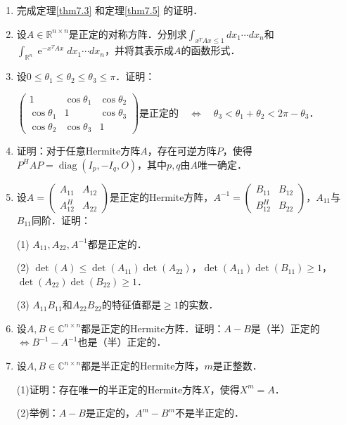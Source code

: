 \documentclass[a4paper,fontset=windows]{ctexbook}
\theoremstyle{definition}
\DeclareMathOperator{\diag}{diag}
\DeclareMathOperator{\E}{e}
\renewcommand{\le}{\leqslant}
\renewcommand{\ge}{\geqslant}
\begin{document}
\begin{enumerate}
\item 完成定理\ref{thm7.3} 和定理\ref{thm7.5} 的证明．

\item 设$A\in\mathbb{R}^{n\times n}$是正定的对称方阵．分别求$\displaystyle\int_{x^TAx\le 1}dx_1\cdots dx_n$和$\displaystyle\int_{\mathbb{R}^n}\E^{-x^TAx}dx_1\cdots dx_n$，并将其表示成$A$的函数形式．

\item 设$0\le\theta_1\le\theta_2\le\theta_3\le\pi$．证明：
\begin{center}
$\begin{pmatrix}1&\cos\theta_1&\cos\theta_2 \\ \cos\theta_1&1&\cos\theta_3 \\ \cos\theta_2&\cos\theta_3&1\end{pmatrix}$是正定的$\quad\Leftrightarrow\quad\theta_3<\theta_1+\theta_2<2\pi-\theta_3$．
\end{center}

\item 证明：对于任意Hermite方阵$A$，存在可逆方阵$P$，使得$P^HAP=\diag(I_p,-I_q,O)$，其中$p,q$由$A$唯一确定．

\item 设$A=\begin{pmatrix}A_{11}&A_{12} \\ A_{12}^H&A_{22}\end{pmatrix}$是正定的Hermite方阵，$A^{-1}=\begin{pmatrix}B_{11}&B_{12} \\ B_{12}^H&B_{22}\end{pmatrix}$，$A_{11}$与$B_{11}$同阶．证明：

(1) $A_{11},A_{22},A^{-1}$都是正定的．

(2) $\det(A)\le\det(A_{11})\det(A_{22})$，$\det(A_{11})\det(B_{11})\ge 1$，$\det(A_{22})\det(B_{22})\ge 1$．

(3) $A_{11}B_{11}$和$A_{22}B_{22}$的特征值都是$\ge 1$的实数．

\item 设$A,B\in\mathbb{C}^{n\times n}$都是正定的Hermite方阵．证明：$A-B$是（半）正定的$\Leftrightarrow B^{-1}-A^{-1}$也是（半）正定的．

\item 设$A,B\in\mathbb{C}^{n\times n}$都是半正定的Hermite方阵，$m$是正整数．

(1)证明：存在唯一的半正定的Hermite方阵$X$，使得$X^m=A$．

(2)举例：$A-B$是正定的，$A^m-B^m$不是半正定的．


\end{enumerate}
\end{document}
